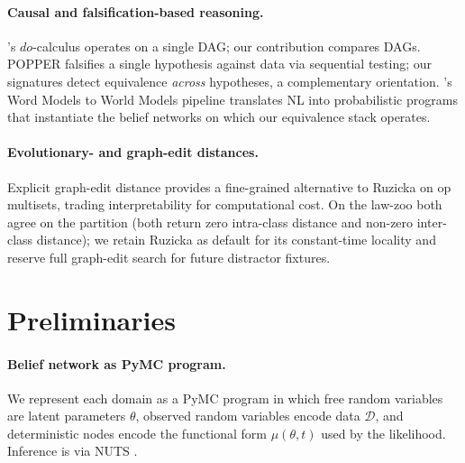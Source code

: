 \documentclass{article}
\begin{document}
\paragraph{Causal and falsification-based reasoning.}
\citet{pearl2000causality}'s $do$-calculus operates on a single DAG;
our contribution compares DAGs. POPPER
\citep{huang2025popperllm} falsifies a single hypothesis against data
via sequential testing; our signatures detect equivalence \emph{across}
hypotheses, a complementary orientation. \citet{wong2023wordmodels}'s
Word Models to World Models pipeline translates NL into probabilistic
programs that instantiate the belief networks on which our
equivalence stack operates.

\paragraph{Evolutionary- and graph-edit distances.}
Explicit graph-edit distance \citep{gao2010surveygraphedit} provides a
fine-grained alternative to Ruzicka on op multisets, trading
interpretability for computational cost. On the law-zoo both agree on
the partition (both return zero intra-class distance and non-zero
inter-class distance); we retain Ruzicka as default for its
constant-time locality and reserve full graph-edit search for
future distractor fixtures.

\section{Preliminaries}
\label{sec:prelim}

\paragraph{Belief network as PyMC program.}
We represent each domain as a PyMC program
\citep{salvatier2016pymc, phan2019numpyro} in which free random
variables are latent parameters $\theta$, observed random variables
encode data $\mathcal{D}$, and deterministic nodes encode the
functional form $\mu(\theta, t)$ used by the likelihood. Inference is
via NUTS \citep{hoffman2014nuts}.
\end{document}
